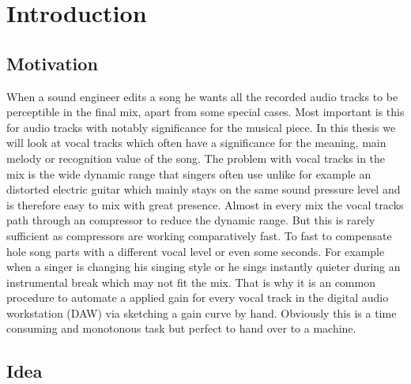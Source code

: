 \chapter{Introduction}
\label{chapter:introduction}

\section{Motivation}

When a sound engineer edits a song he wants all the recorded audio tracks to be perceptible in the final mix, apart from some special cases. Most important is this for audio tracks with notably significance for the musical piece. In this thesis we will look at vocal tracks which often have a significance for the meaning, main melody or recognition value of the song. The problem with vocal tracks in the mix is the wide dynamic range that singers often use unlike for example an distorted electric guitar which mainly stays on the same sound pressure level and is therefore easy to mix with great presence. Almost in every mix the vocal tracks path through an compressor to reduce the dynamic range. But this is rarely sufficient as compressors are working comparatively fast. To fast to compensate hole song parts with a different vocal level or even some seconds. For example when a singer is changing his singing style or he sings instantly quieter during an instrumental break which may not fit the mix. That is why it is an common procedure to automate a applied gain for every vocal track in the digital audio workstation (DAW) via sketching a gain curve by hand. Obviously this is a time consuming and monotonous task but perfect to hand over to a machine.

\section{Idea}



